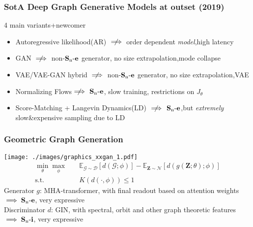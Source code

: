 \documentclass[./presentation.tex]{subfiles}
\begin{document}
\begin{frame}[label=ggg]
  \frametitle{SotA Deep Graph Generative Models at outset (2019)}
  \small
  4 main variants+newcomer
  \begin{itemize}
    \item Autoregressive likelihood(AR) $\centernot\implies$ order dependent \emph{model},high latency
    \item GAN %
      $\centernot\implies$ non-$\operatorname{\mathbf{S}_n\mathbf{-e}}$ generator, no size extrapolation,mode collapse
    \item VAE/VAE-GAN hybrid%
      $\centernot\implies$ non-$\operatorname{\mathbf{S}_n\mathbf{-e}}$ generator, no size extrapolation,VAE%
    \item Normalizing Flows$\centernot\implies$ $\operatorname{\mathbf{S}_n\mathbf{-e}}$, slow training, restrictions on $J_\theta$%
    \item Score-Matching + Langevin Dynamics(LD)  $\centernot\implies$ $\operatorname{\mathbf{S}_n\mathbf{-e}}$,but \emph{extremely} slow\&expensive sampling due to LD
  \end{itemize}
\end{frame}


\begin{frame}[label=ggg,t]
  \frametitle{Geometric Graph Generation}
  \texttt{[image: ./images/graphics\_xxgan\_1.pdf]}
  \vspace{-0.5cm}
  \begin{align}
    \min_{\theta}\max_{\phi}&\quad\mathbb{E}_{\mathcal{G}\sim \mathcal{D}}\left[d\left(\mathcal{G};\phi\right)\right]-\mathbb{E}_{\mathbf{Z}\sim \mathcal{N}}\left[d\left(g(\mathbf{Z};\theta);\phi\right)\right]\nonumber\\
    \text{s.t.}&\quad K\left(d\left(\cdot,\phi\right)\right)\leq 1\nonumber
  \end{align}
  \vspace{-0.25cm}
  Generator $g$: MHA-transformer, with final readout based on attention weights$\implies\operatorname{\mathbf{S}_n\mathbf{-e}}$, very expressive\\
  Discriminator $d$: GIN, with spectral, orbit and other graph theoretic features$\implies\operatorname{\mathbf{S}_n\mathbf{-i}}$, very expressive
\end{frame}
\end{document}
